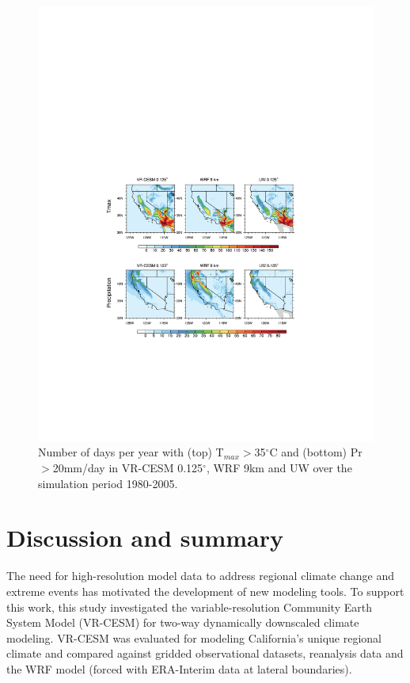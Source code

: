 \begin{figure}
\begin{center}
\includegraphics[width=6in]{t2max>35_pr>20.pdf}
\end{center}
\caption{Number of days per year with (top) T$_{max}$$>$35$^\circ$C and (bottom) Pr$>$20mm/day in VR-CESM 0.125$^\circ$, WRF 9km and UW over the simulation period 1980-2005.} \label{fig:Figure 13}
\end{figure}

\section{Discussion and summary} \label{sec:Discussion}

The need for high-resolution model data to address regional climate change and extreme events has motivated the development of new modeling tools. To support this work, this study investigated the variable-resolution Community Earth System Model (VR-CESM) for two-way dynamically downscaled climate modeling. VR-CESM was evaluated for modeling California's unique regional climate and compared against gridded observational datasets, reanalysis data and the WRF model (forced with ERA-Interim data at lateral boundaries).

